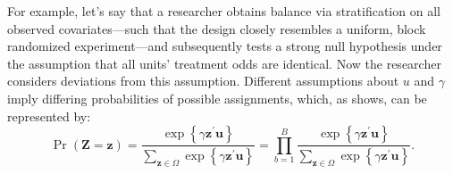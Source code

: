 \documentclass[11pt,leqno]{article}\usepackage[]{graphicx}\usepackage[]{color}
\theoremstyle{newstyle}
\begin{document}
For example, let's say that a researcher obtains balance via stratification on all observed covariates---such that the design closely resembles a uniform, block randomized experiment---and subsequently tests a strong null hypothesis under the assumption that all units' treatment odds are identical. Now the researcher considers deviations from this assumption. Different assumptions about $u$ and $\gamma$ imply differing probabilities of possible assignments, which, as \citet[Chapter 4]{rosenbaum2002observational} shows, can be represented by:
\begin{equation}
\Pr\left(\mathbf{Z} = \mathbf{z}\right) = \frac{\exp\left\{\gamma \mathbf{z}^{\prime}\mathbf{u}\right\}}{\sum_{\mathbf{z} \in \Omega} \exp\left\{\gamma \mathbf{z}^{\prime}\mathbf{u}\right\}} = \prod \limits_{b = 1}^B \frac{\exp\left\{\gamma \mathbf{z}^{\prime}\mathbf{u}\right\}}{\sum_{\mathbf{z} \in \Omega} \exp\left\{\gamma \mathbf{z}^{\prime}\mathbf{u}\right\}}.
\label{eq: prob omega sens}
\end{equation}
\end{document}
